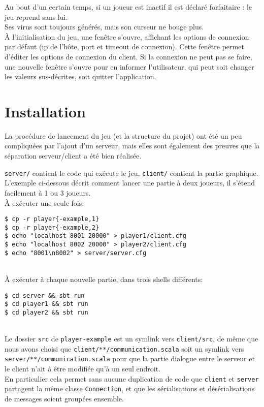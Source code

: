 \documentclass[a4paper,french]{article}
\newcommand{\ttt}[1]{\texttt{#1}}
\begin{document}
Au bout d'un certain temps, si un joueur est inactif il est déclaré forfaitaire : le jeu reprend sans lui.\\
Ses virus sont toujours générés, mais son curseur ne bouge plus.\\

\`A l'initialisation du jeu, une fenêtre s'ouvre, affichant les options de connexion par défaut (ip de l'hôte, port et
timeout de connexion). Cette fenêtre permet d'éditer les options de connexion du client. Si la connexion ne peut pas se
faire, une nouvelle fenêtre s'ouvre pour en informer l'utilisateur, qui peut soit changer les valeurs sus-décrites, soit
quitter l'application.


\section{Installation}

La procédure de lancement du jeu (et la structure du projet) ont été un peu compliquées par l'ajout d'un serveur,
mais elles sont également des preuves que la séparation serveur/client a été bien réalisée.

\ttt{server/} contient le code qui exécute le jeu, \ttt{client/} contient la partie graphique.\\

L'exemple ci-dessous décrit comment lancer une partie à deux joueurs, il s'étend facilement à 1 ou 3 joueurs.\\

\`A exécuter une seule fois:
\begin{lstlisting}
$ cp -r player{-example,1}
$ cp -r player{-example,2}
$ echo "localhost 8001 20000" > player1/client.cfg
$ echo "localhost 8002 20000" > player2/client.cfg
$ echo "8001\n8002" > server/server.cfg
\end{lstlisting}~\\


\`A exécuter à chaque nouvelle partie, dans trois shells différents:
\begin{lstlisting}
$ cd server && sbt run
$ cd player1 && sbt run
$ cd player2 && sbt run
\end{lstlisting}~\\

Le dossier \ttt{src} de \ttt{player-example} est un symlink vers \ttt{client/src}, de même que nous avons choisi
que \ttt{client/**/communication.scala} soit un symlink vers \ttt{server/**/communication.scala} pour que la partie
dialogue entre le serveur et le client n'ait à être modifiée qu'à un seul endroit.\\
En particulier cela permet sans aucune duplication de code que \ttt{client} et \ttt{server} partagent la même classe
\ttt{Connection}, et que les sérialisations et désérialisations de messages soient groupées ensemble.
\end{document}
